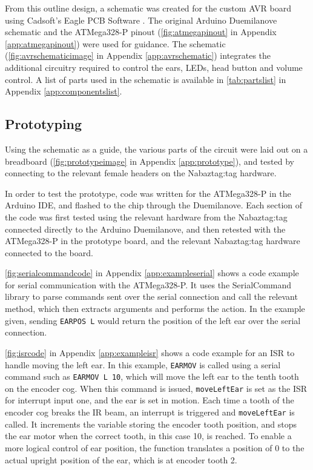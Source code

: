 \documentclass[12pt, a4paper]{article}
\begin{document}
		From this outline design, a schematic was created for the custom AVR board using Cadsoft's Eagle PCB Software \parencite{eaglepcb}. The original Arduino Duemilanove schematic \parencite{duemilanoveschematic} and the ATMega328-P pinout (\autoref{fig:atmegapinout} in Appendix \ref{app:atmegapinout}) were used for guidance. The schematic (\autoref{fig:avrschematicimage} in Appendix \ref{app:avrschematic}) integrates the additional circuitry required to control the ears, \acp{LED}, head button and volume control. A list of parts used in the schematic is available in \autoref{tab:partslist} in Appendix \ref{app:componentslist}.
		
		\subsection{Prototyping}
		
		Using the schematic as a guide, the various parts of the circuit were laid out on a breadboard (\autoref{fig:prototypeimage} in Appendix \ref{app:prototype}), and tested by connecting to the relevant female headers on the Nabaztag:tag hardware.
		
		In order to test the prototype, code was written for the ATMega328-P in the Arduino IDE, and flashed to the chip through the Duemilanove. Each section of the code was first tested using the relevant hardware from the Nabaztag:tag connected directly to the Arduino Duemilanove, and then retested with the ATMega328-P in the prototype board, and the relevant Nabaztag:tag hardware connected to the board.
		
		\autoref{fig:serialcommandcode} in Appendix \ref{app:exampleserial} shows a code example for serial communication with the ATMega328-P. It uses the SerialCommand library \parencite{serialcommand} to parse commands sent over the serial connection and call the relevant method, which then extracts arguments and performs the action. In the example given, sending \verb+EARPOS L+ would return the position of the left ear over the serial connection.
		
		\autoref{fig:isrcode} in Appendix \ref{app:exampleisr} shows a code example for an \ac{ISR} to handle moving the left ear. In this example, \verb+EARMOV+ is called using a serial command such as \verb+EARMOV L 10+, which will move the left ear to the tenth tooth on the encoder cog. When this command is issued, \verb+moveLeftEar+ is set as the \ac{ISR} for interrupt input one, and the ear is set in motion. Each time a tooth of the encoder cog breaks the \ac{IR} beam, an interrupt is triggered and \verb+moveLeftEar+ is called. It increments the variable storing the encoder tooth position, and stops the ear motor when the correct tooth, in this case 10, is reached. To enable a more logical control of ear position, the function translates a position of $0$ to the actual upright position of the ear, which is at encoder tooth 2.
		
\end{document}
